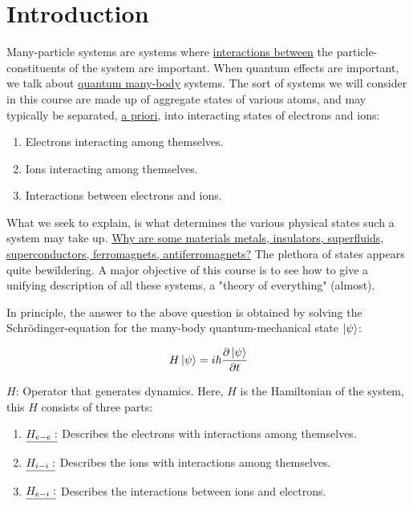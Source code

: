 \chapter{Introduction} 

\noindent Many-particle systems are systems where \uline{interactions between} the particle-constituents of the system are important. When quantum effects are important, we talk about \uline{quantum many-body} systems. The sort of systems we will consider in this course are made up of aggregate states of various atoms, and may typically be separated, \uline{a priori}, into interacting states of electrons and ions:

\begin{enumerate}
	\item
		Electrons interacting among themselves.
	\item 
		Ions interacting among themselves.
	\item
		Interactions between electrons and ions.
\end{enumerate}

\noindent What we seek to explain, is what determines the various physical states such a system may take up. \uline{Why are some materials metals, insulators, superfluids, superconductors, ferromagnets, antiferromagnets?} The plethora of states appears quite bewildering. A major objective of this course is to see how to give a unifying description of all these systems, a "theory of everything" (almost).

In principle, the answer to the above question is obtained by solving the Schrödinger-equation for the many-body quantum-mechanical state $\ket{\psi}$:

\begin{equation}
	H \ket{\psi} = i \hbar \frac{\partial \ket{\psi}}{\partial t}
\end{equation}

\noindent $H$: Operator that generates dynamics. Here, $H$ is the Hamiltonian of the system, this $H$ consists of three parts:

\begin{enumerate}
	\item
		$\uline{H_{e-e}:}$ Describes the electrons with interactions among themselves.
	\item
		$\uline{H_{i-i}:}$ Describes the ions with interactions among themselves.
	\item
		$\uline{H_{e-i}:}$ Describes the interactions between ions and electrons.
\end{enumerate}

